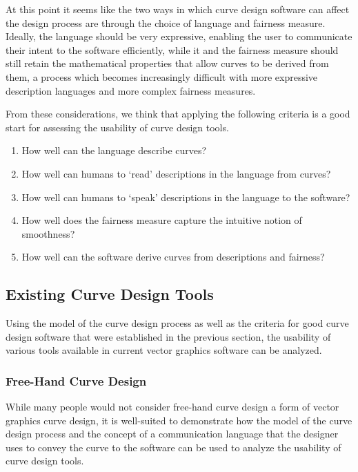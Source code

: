 \documentclass[a4paper]{article}
\begin{document}
			At this point it seems like the two ways in which curve design software can affect the design process are through the choice of language and fairness measure. Ideally, the language should be very expressive, enabling the user to communicate their intent to the software efficiently, while it and the fairness measure should still retain the mathematical properties that allow curves to be derived from them, a process which becomes increasingly difficult with more expressive description languages and more complex fairness measures.

			From these considerations, we think that applying the following criteria is a good start for assessing the usability of curve design tools.

			\begin{enumerate}
				\item How well can the language describe curves?
				\item How well can humans to `read' descriptions in the language from curves?
				\item How well can humans to `speak' descriptions in the language to the software?
				\item How well does the fairness measure capture the intuitive notion of smoothness?
				\item How well can the software derive curves from descriptions and fairness?
			\end{enumerate}

		\subsection{Existing Curve Design Tools}

			Using the model of the curve design process as well as the criteria for good curve design software that were established in the previous section, the usability of various tools available in current vector graphics software can be analyzed.

			\subsubsection{Free-Hand Curve Design}

				While many people would not consider free-hand curve design a form of vector graphics curve design, it is well-suited to demonstrate how the model of the curve design process and the concept of a communication language that the designer uses to convey the curve to the software can be used to analyze the usability of curve design tools.
\end{document}
